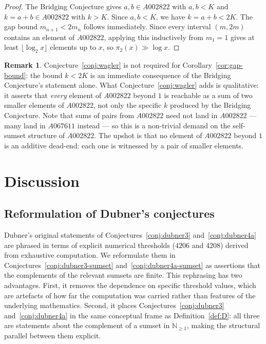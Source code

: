 \documentclass[12pt]{amsart}
\theoremstyle{definition}
\newtheorem{remark}[theorem]{Remark}
\newcommand{\N}{\mathbb{N}}
\begin{document}
\begin{proof}
The Bridging Conjecture gives $a, b \in A002822$ with $a, b < K$ and $k = a + b \in A002822$
with $k > K$. Since $a, b < K$, we have $k = a + b < 2K$. The gap bound
$m_{n+1} < 2m_n$ follows immediately. Since every interval $(m, 2m)$ contains
an element of $A002822$, applying this inductively from $m_1 = 1$ gives at least
$\lfloor \log_2 x \rfloor$ elements up to $x$, so $\pi_2(x) \gg \log x$.
\end{proof}

\begin{remark}
\label{rem:conj1-role}
Conjecture~\ref{conj:wagler} is not required for Corollary~\ref{cor:gap-bound}:
the bound $k < 2K$ is an immediate consequence of the Bridging Conjecture's statement
alone. What Conjecture~\ref{conj:wagler} adds is qualitative: it asserts that
\emph{every} element of $A002822$ beyond $1$ is reachable as a sum of two smaller
elements of $A002822$, not only the specific $k$ produced by the Bridging Conjecture.
Note that sums of pairs from $A002822$ need not land in $A002822$ — many land in
$A067611$ instead — so this is a non-trivial demand on the self-sumset structure of
$A002822$. The upshot is that no element of $A002822$ beyond $1$ is an additive
dead-end: each one is witnessed by a pair of smaller elements.
\end{remark}

\section{Discussion}
\label{sec:discussion}

\subsection*{Reformulation of Dubner's conjectures}

Dubner's original statements of Conjectures~\ref{conj:dubner3} and~\ref{conj:dubner4a}
are phrased in terms of explicit numerical thresholds ($4206$ and $4208$) derived from
exhaustive computation. We reformulate them in
Conjectures~\ref{conj:dubner3-sumset} and~\ref{conj:dubner4a-sumset} as assertions that
the complements of the relevant sumsets are finite. This rephrasing has two advantages.
First, it removes the dependence on specific threshold values, which are artefacts of
how far the computation was carried rather than features of the underlying mathematics.
Second, it places Conjectures~\ref{conj:dubner3} and~\ref{conj:dubner4a} in the same
conceptual frame as Definition~\ref{def:D}: all three are statements about the
complement of a sumset in $\N_{\geq 1}$, making the structural parallel between them
explicit.
\end{document}
